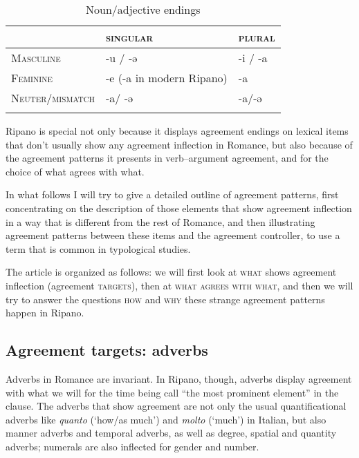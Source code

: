 \documentclass[output=paper
,modfonts
,nonflat]{langsci/langscibook}
\begin{document}
	\begin{table}
		\caption{Noun/adjective endings}
		\label{tab-dalessandro:2}
		\begin{tabularx}{\textwidth}{XXX}
			\lsptoprule
			 & \textsc{singular} & \textsc{plural}\\
			\midrule
			\textsc{Masculine} & -u / -ə & -i / -a\\
			\textsc{Feminine} & -e (-a in modern Ripano) & -a\\
			\textsc{Neuter/mismatch} & -a/ -ə\footnotemark & -a/-ə\\
			\lspbottomrule
		\end{tabularx}
	\end{table}
\noindent Ripano is special not only because it displays agreement endings on lexical items that don’t usually show any agreement inflection in Romance, but also because of the agreement patterns it presents in verb--argument agreement, and for the choice of what agrees with what.

In what follows I will try to give a detailed outline of agreement patterns, first concentrating on the description of those elements that show agreement inflection in a way that is different from the rest of Romance, and then illustrating agreement patterns between these items and the agreement controller, to use a term that is common in typological studies.

The article is organized as follows: we will first look at \textsc{what} shows agreement inflection (agreement \textsc{targets}), then at \textsc{what agrees with what}, and then we will try to answer the questions \textsc{how} and \textsc{why} these strange agreement patterns happen in Ripano. 

\subsection{ Agreement targets: adverbs} \label{sec-dalessandro:1.2}
Adverbs in Romance are invariant. In Ripano, though, adverbs display agreement with what we will for the time being call “the most prominent element” in the clause. The adverbs that show agreement are not only the usual quantificational adverbs like \textit{quanto} (‘how/as much’) and \textit{molto} (‘much’) in Italian, but also manner adverbs and temporal adverbs, as well as degree, spatial and quantity adverbs; numerals are also inflected for gender and number.
\end{document}
